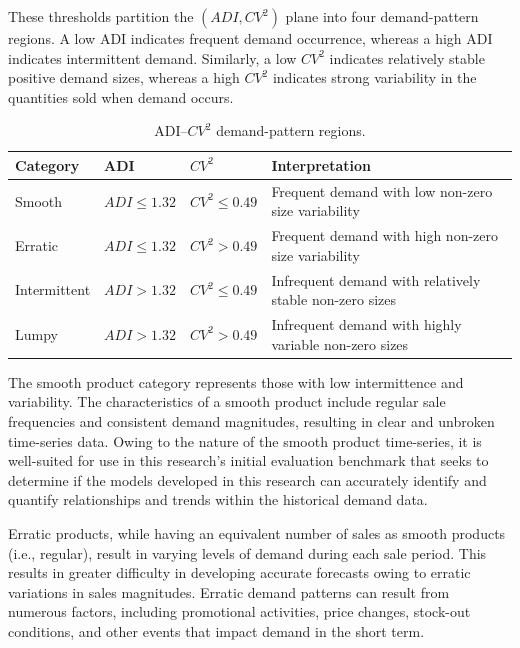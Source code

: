 These thresholds partition the $(ADI, CV^2)$ plane into four demand-pattern regions. A low ADI indicates frequent demand occurrence, whereas a high ADI indicates intermittent demand. Similarly, a low $CV^2$ indicates relatively stable positive demand sizes, whereas a high $CV^2$ indicates strong variability in the quantities sold when demand occurs.

\begin{table}[h]
\centering
\caption{ADI--$CV^2$ demand-pattern regions.}
\label{tab:adi-cv2-regions}
\begin{tabular}{llll}
\toprule
\textbf{Category} & \textbf{ADI} & \textbf{$CV^2$} & \textbf{Interpretation} \\
\midrule
Smooth 
& $ADI \le 1.32$ 
& $CV^2 \le 0.49$ 
& Frequent demand with low non-zero size variability \\

Erratic 
& $ADI \le 1.32$ 
& $CV^2 > 0.49$ 
& Frequent demand with high non-zero size variability \\

Intermittent 
& $ADI > 1.32$ 
& $CV^2 \le 0.49$ 
& Infrequent demand with relatively stable non-zero sizes \\

Lumpy 
& $ADI > 1.32$ 
& $CV^2 > 0.49$ 
& Infrequent demand with highly variable non-zero sizes \\
\bottomrule
\end{tabular}
\end{table}

The smooth product category represents those with low intermittence and variability. The characteristics of a smooth product include regular sale frequencies and consistent demand magnitudes, resulting in clear and unbroken time-series data. Owing to the nature of the smooth product time-series, it is well-suited for use in this research's initial evaluation benchmark that seeks to determine if the models developed in this research can accurately identify and quantify relationships and trends within the historical demand data.

Erratic products, while having an equivalent number of sales as smooth products (i.e., regular), result in varying levels of demand during each sale period. This results in greater difficulty in developing accurate forecasts owing to erratic variations in sales magnitudes. Erratic demand patterns can result from numerous factors, including promotional activities, price changes, stock-out conditions, and other events that impact demand in the short term.

